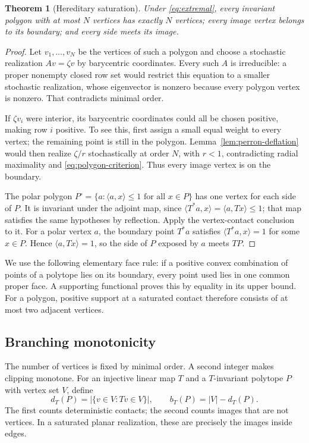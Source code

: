 \documentclass[11pt,a4paper]{article}
\newtheorem{theorem}{Theorem}[section]
\theoremstyle{definition}
\theoremstyle{remark}
\numberwithin{equation}{section}
\begin{document}
\begin{theorem}[Hereditary saturation]\label{thm:saturation}
Under \eqref{eq:extremal}, every invariant polygon with at most $N$ vertices has exactly $N$ vertices; every image vertex belongs to its boundary; and every side meets its image.
\end{theorem}
\begin{proof}
Let $v_1,\ldots,v_N$ be the vertices of such a polygon and choose a stochastic realization $Av=\zeta v$ by barycentric coordinates.
Every such $A$ is irreducible: a proper nonempty closed row set would restrict this equation to a smaller stochastic realization, whose eigenvector is nonzero because every polygon vertex is nonzero.
That contradicts minimal order.

If $\zeta v_i$ were interior, its barycentric coordinates could all be chosen positive, making row $i$ positive.
To see this, first assign a small equal weight to every vertex; the remaining point is still in the polygon.
Lemma~\ref{lem:perron-deflation} would then realize $\zeta/r$ stochastically at order $N$, with $r<1$, contradicting radial maximality and \eqref{eq:polygon-criterion}.
Thus every image vertex is on the boundary.

The polar polygon $P^\circ=\{a:\langle a,x\rangle\le1\text{ for all }x\in P\}$ has one vertex for each side of $P$.
It is invariant under the adjoint map, since $\langle T^*a,x\rangle=\langle a,Tx\rangle\le1$; that map satisfies the same hypotheses by reflection.
Apply the vertex-contact conclusion to it.
For a polar vertex $a$, the boundary point $T^*a$ satisfies $\langle T^*a,x\rangle=1$ for some $x\in P$.
Hence $\langle a,Tx\rangle=1$, so the side of $P$ exposed by $a$ meets $TP$.
\end{proof}

We use the following elementary face rule: if a positive convex combination of points of a polytope lies on its boundary, every point used lies in one common proper face.
A supporting functional proves this by equality in its upper bound.
For a polygon, positive support at a saturated contact therefore consists of at most two adjacent vertices.

\subsection{Branching monotonicity}
The number of vertices is fixed by minimal order. A second integer makes clipping monotone. For an injective linear map $T$ and a $T$-invariant polytope $P$ with vertex set $V$, define
\[
 d_T(P)=|\{v\in V:Tv\in V\}|,\qquad
 b_T(P)=|V|-d_T(P).
\]
The first counts deterministic contacts; the second counts images that are not vertices. In a saturated planar realization, these are precisely the images inside edges.
\end{document}
